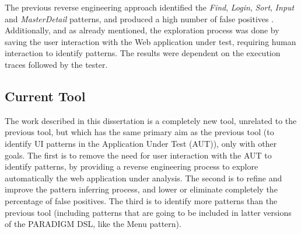\begin{table}[!htb]
\caption{Abbreviated example of an execution trace file.}
\label{tab:exec}
\end{table}

The previous reverse engineering approach identified the \textit{Find}, \textit{Login}, \textit{Sort}, \textit{Input} and \textit{MasterDetail} patterns, and produced a high number of false positives \cite{nabuco2013inferring}. Additionally, and as already mentioned, the exploration process was done by saving the user interaction with the Web application under test, requiring human interaction to identify patterns. The results were dependent on the execution traces followed by the tester. \\

\subsection{Current Tool}

The work described in this dissertation is a completely new tool, unrelated to the previous tool, but which has the same primary aim as the previous tool (to identify UI patterns in the Application Under Test (AUT)), only with other goals. The first is to remove the need for user interaction with the AUT to identify patterns, by providing a reverse engineering process to explore automatically the web application under analysis. The second is to refine and improve the pattern inferring process, and lower or eliminate completely the percentage of false positives. The third is to identify more patterns than the previous tool (including patterns that are going to be included in latter versions of the PARADIGM DSL, like the Menu pattern).\\

